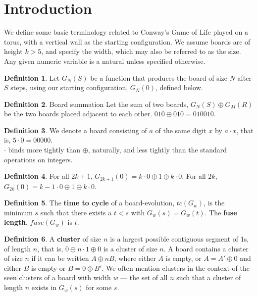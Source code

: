 \documentclass[12pt,letterpaper]{article}
\begin{document}
\theoremstyle{plain}
\newtheorem{prop}{Proposition}[section]
\newtheorem{cor}{Corollary}[prop]
\theoremstyle{definition}
\newtheorem{dfn}[prop]{Definition}

\section{Introduction}
We define some basic terminology related to Conway's Game of Life played on a torus, with a vertical wall as the starting configuration. We assume boards are of height $k>5$, and specify the width, which may also be referred to as the size. Any given numeric variable is a natural unless specified otherwise. 
\begin{dfn}
  Let $G_N(S)$ be a function that produces the board of size $N$ after $S$ steps, using our starting configuration, $G_N(0)$, defined below.
\end{dfn}
\begin{dfn}{Board summation}
  Let the sum of two boards, $G_N(S)\oplus G_M(R)$ be the two boards placed adjacent to each other. $010\oplus 010 = 010010$.
\end{dfn}
\begin{dfn}
  We denote a board consisting of $a$ of the same digit $x$ by $a\cdot x$, that is, $5\cdot 0=00000$. \\
  $\cdot$ binds more tightly than $\oplus$, naturally, and less tightly than the standard operations on integers. 
\end{dfn}
\begin{dfn}
  For all $2k+1$, $G_{2k+1}(0)= k\cdot 0 \oplus 1 \oplus k\cdot 0$. For all $2k$, $G_{2k}(0) = k-1\cdot 0 \oplus 1 \oplus k\cdot 0$. 
\end{dfn}
\begin{dfn} \label{cycles}
  The {\bf time to cycle} of a board-evolution, $tc(G_w)$, is the minimum $s$ such that there exists a $t<s$ with $G_w(s)=G_w(t)$. The {\bf fuse length}, $fuse(G_w)$ is $t$. 
\end{dfn}
\begin{dfn} \label{cluster}
  A {\bf cluster} of size $n$ is a largest possible contiguous segment of 1s, of length $n$,  that is, $0\oplus n\cdot 1\oplus 0$ is a cluster of size $n$. A board contains a cluster of size $n$ if it can be written $A\oplus n B$, where either $A$ is empty, or $A=A'\oplus 0$ and either $B$ is empty or $B=0\oplus B'$. We often mention clusters in the context of the seen clusters of a board with width $w$ --- the set of all $n$ such that a cluster of length $n$ exists in $G_w(s)$ for some $s$. 
\end{dfn}
\end{document}
